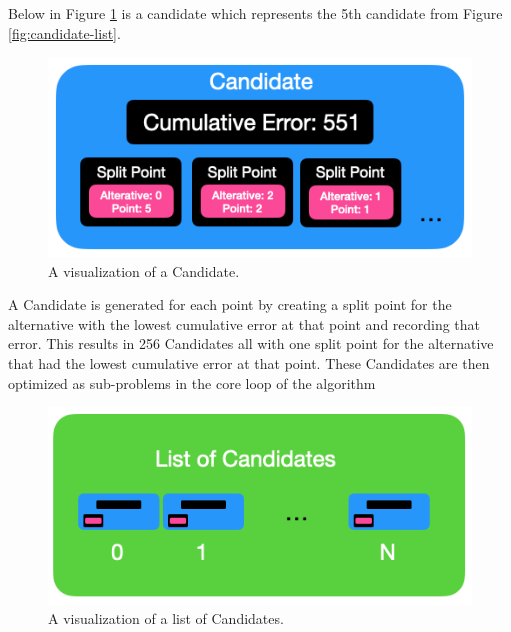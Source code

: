 \documentclass{article}
\begin{document}
Below in Figure \ref{fig:candidate} is a candidate which represents the 5th candidate from Figure \ref{fig:candidate-list}.

\begin{figure}[htbp]
\begin{center}
\includegraphics[scale=0.69]{candidate.png}
\caption{A visualization of a Candidate.}
\label{fig:candidate}
\end{center}
\end{figure}

A Candidate is generated for each point by creating a split point for the alternative with the lowest cumulative error at that point and recording that error. This results in 256 Candidates all with one split point for the alternative that had the lowest cumulative error at that point. These Candidates are then optimized as sub-problems in the core loop of the algorithm

\begin{figure}[htbp]
\begin{center}
\includegraphics[scale=0.69]{list-of-candidates.png}
\caption{A visualization of a list of Candidates.}
\label{fig:list-of-candidates}
\end{center}
\end{figure}
\end{document}
